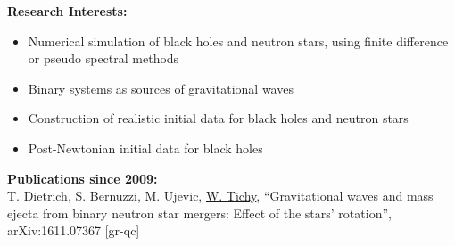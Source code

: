 \documentclass[11pt]{article}
\begin{document}
%
%
%
%
%
%

\bigskip

{\bf Research Interests:}

\begin{itemize}
\item	Numerical simulation of black holes and
	neutron stars, using finite difference or pseudo spectral methods
\item	Binary systems as sources of gravitational waves
\item	Construction of realistic initial data for
	black holes and neutron stars
\item	Post-Newtonian initial data for black holes
\end{itemize}

\medskip

{\bf Publications since 2009:}\\

T. Dietrich, S. Bernuzzi, M. Ujevic, \underline{W. Tichy},
``Gravitational waves and mass ejecta from binary neutron star mergers:
Effect of the stars' rotation'',
arXiv:1611.07367 [gr-qc]
\\
\end{document}
